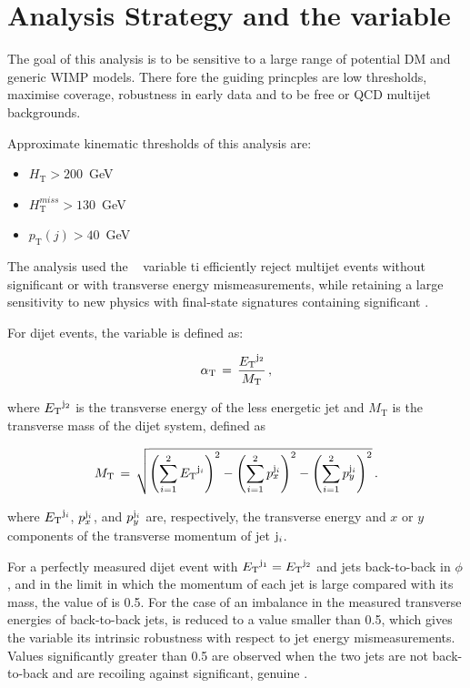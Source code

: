 \section{Analysis Strategy and the \alphat variable}

The goal of this analysis is to be sensitive to a large range of potential DM and generic WIMP models.
There fore the guiding princples are low thresholds, maximise coverage, robustness in early data and to be 
free or QCD multijet backgrounds.

Approximate kinematic thresholds of this analysis are:
\begin{itemize}
   \item  $H_\textrm{T}>200$~GeV
   \item  $H^{miss}_\textrm{T}>130$~GeV
   \item  $p_\textrm{T}(j)>40$~GeV
\end{itemize}

The analysis used the \alphat~\cite{Randall:2008rw, CMS:2008vya, CMS-PAS-SUS-09-001} variable 
ti efficiently reject multijet events without significant \met or with
transverse energy mismeasurements, while retaining a large sensitivity
to new physics with final-state signatures containing significant \met.

For dijet events, the \alphat variable is defined as:

\begin{equation}
\label{eq:alphat}
\alpha_{\text{T}}\, =\, \frac{{E_{\text T}}^{{\rm j}_2}}{M_\text{T}} \, ,
\end{equation}

where ${E_{\text T}}^{\rm j_2}$ is the transverse energy of the less energetic
jet and $M_\text{T}$ is the transverse mass of the dijet system,
defined as

\begin{equation}
  \label{eq:mt}
  M_\text{T}\, = \,\sqrt{ \left( \sum_{i=1}^2 {E_{\text T}}^{{\rm j}_i}
    \right)^2 - \left( \sum_{i=1}^2 p_x^{{\rm j}_i} \right)^2 - \left(
      \sum_{i=1}^2 p_y^{{\rm j}_i} \right)^2} \, .
\end{equation}

where ${E_{\text T}}^{{\rm j}_i}$, $p_x^{{\rm j}_i}$, and $p_y^{{\rm j}_i}$ are,
respectively, the transverse energy and $x$ or $y$ components of the
transverse momentum of jet ${\rm j}_i$.

For a perfectly measured dijet event with ${E_{\text T}}^{\rm j_1} = {E_{\text T}}^{\rm j_2}$ and jets back-to-back in $\phi$, and in the limit in which the
momentum of each jet is large compared with its mass, the value of \alphat is 0.5. For the case of an imbalance in the measured
transverse energies of back-to-back jets, \alphat is reduced to a value smaller than 0.5, which gives the variable its intrinsic
robustness with respect to jet energy mismeasurements. Values significantly greater than 0.5 are observed when the two jets are not
back-to-back and are recoiling against significant, genuine \met.

